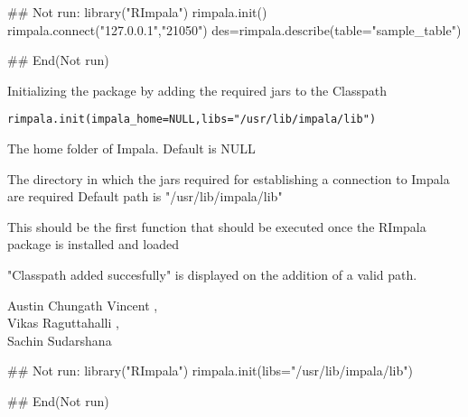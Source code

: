 \documentclass[letterpaper]{book}
\begin{document}
%
\begin{Examples}
\begin{ExampleCode}
## Not run: 
library("RImpala")
rimpala.init()
rimpala.connect("127.0.0.1","21050")
des=rimpala.describe(table="sample_table")

## End(Not run)
\end{ExampleCode}
\end{Examples}
%
\begin{Description}\relax
Initializing the package by adding the required jars to the Classpath
\end{Description}
%
\begin{Usage}
\begin{verbatim}
rimpala.init(impala_home=NULL,libs="/usr/lib/impala/lib")
\end{verbatim}
\end{Usage}
%
\begin{Arguments}
\begin{ldescription}
\item[\code{impala\_home}] 
The home folder of Impala. Default is NULL

\item[\code{libs}] 
The directory in which the jars required for establishing a connection to Impala are required
Default path is "/usr/lib/impala/lib"
\end{ldescription}
\end{Arguments}
%
\begin{Details}\relax
This should be the first function that should be executed once the RImpala package is installed and loaded 
\end{Details}
%
\begin{Value}
"Classpath added succesfully" is displayed on the addition of a valid path.
\end{Value}
%
\begin{Author}\relax
Austin Chungath Vincent ,\\{}
Vikas Raguttahalli ,\\{}
Sachin Sudarshana 
\end{Author}
%
\begin{Examples}
\begin{ExampleCode}
## Not run: 
library("RImpala")
rimpala.init(libs="/usr/lib/impala/lib")

## End(Not run)
\end{ExampleCode}
\end{Examples}
\end{document}
